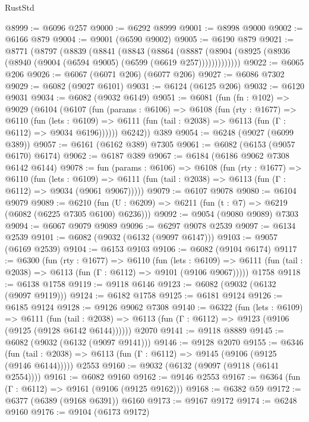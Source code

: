 \begin{lexlean}{RustStd}
\begin{coremodule}
@8999 := @6096 @257
@9000 := @6292 @8999
@9001 := @8998 @9000
@9002 := @6166 @879
@9004 := @9001 (@6590 @9002)
@9005 := @6190 @879
@9021 := @8771
    (@8797
      (@8839
        (@8841
          (@8843
            (@8864
              (@8887
                (@8904 (@8925 (@8936 (@8940 (@9004 (@6594 @9005) (@6599 (@6619 @257)))))))))))))
@9022 := @6065 @206
@9026 := @6067 (@6071 @206) (@6077 @206)
@9027 := @6086 @7302
@9029 := @6082 (@9027 @6101)
@9031 := @6124 (@6125 @206)
@9032 := @6120 @9031
@9034 := @6082 (@9032 @6149)
@9051 := @6081
    (fun (fn : @102) =>
    @9029
      (@6104
        (@6107
          (fun (params : @6106) =>
          @6108
            (fun (rty : @1677) =>
            @6110
              (fun (lets : @6109) =>
              @6111 (fun (tail : @2038) => @6113 (fun (Γ : @6112) => @9034 @6196))))))
        @6242))
    @389
@9054 := @6248 (@9027 (@6099 @389))
@9057 := @6161 (@6162 @389) @7305
@9061 := @6082 (@6153 (@9057 @6170) @6174)
@9062 := @6187 @389
@9067 := @6184 (@6186 @9062 @7308 @6142 @6144)
@9078 := fun (params : @6106) =>
  @6108
    (fun (rty : @1677) =>
    @6110
      (fun (lets : @6109) =>
      @6111 (fun (tail : @2038) => @6113 (fun (Γ : @6112) => @9034 (@9061 @9067)))))
@9079 := @6107 @9078
@9080 := @6104 @9079
@9089 := @6210 (fun (U : @6209) => @6211 (fun (t : @7) => @6219 (@6082 (@6225 @7305 @6100) @6236)))
@9092 := @9054 (@9080 @9089) @7303
@9094 := @6067 @9079 @9089
@9096 := @6297 @9078 @2539
@9097 := @6134 @2539
@9101 := @6082 (@9032 (@6132 (@9097 @6147)))
@9103 := @9057 (@6169 @2539)
@9104 := @6153 @9103
@9106 := @6082 (@9104 @6174)
@9117 := @6300
    (fun (rty : @1677) =>
    @6110
      (fun (lets : @6109) =>
      @6111 (fun (tail : @2038) => @6113 (fun (Γ : @6112) => @9101 (@9106 @9067)))))
    @1758
@9118 := @6138 @1758
@9119 := @9118 @6146
@9123 := @6082 (@9032 (@6132 (@9097 @9119)))
@9124 := @6182 @1758
@9125 := @6181 @9124
@9126 := @6185 @9124
@9128 := @9126 @9062 @7308
@9140 := @6322
    (fun (lets : @6109) =>
    @6111
      (fun (tail : @2038) => @6113 (fun (Γ : @6112) => @9123 (@9106 (@9125 (@9128 @6142 @6144))))))
    @2070
@9141 := @9118 @8889
@9145 := @6082 (@9032 (@6132 (@9097 @9141)))
@9146 := @9128 @2070
@9155 := @6346
    (fun (tail : @2038) => @6113 (fun (Γ : @6112) => @9145 (@9106 (@9125 (@9146 @6144)))))
    @2553
@9160 := @9032 (@6132 (@9097 (@9118 (@6141 @2554))))
@9161 := @6082 @9160
@9162 := @9146 @2553
@9167 := @6364 (fun (Γ : @6112) => @9161 (@9106 (@9125 @9162)))
@9168 := @6382 @59
@9172 := @6377 (@6389 (@9168 @6391)) @6160
@9173 := @9167 @9172
@9174 := @6248 @9160
@9176 := @9104 (@6173 @9172)

\end{coremodule}
\end{lexlean}
